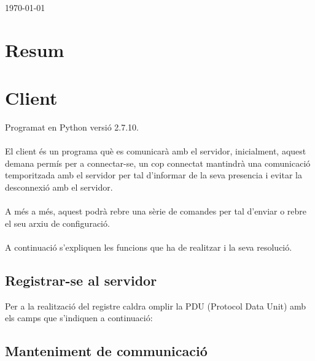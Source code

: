 \documentclass[11pt]{article}
\begin{document}
\begin{titlepage}


{\large \today}\\[3cm] %


\vfill %

\end{titlepage}
\newpage
\section*{Resum}
\justify
\newpage
\tableofcontents
\newpage
\section{Client}
\justify
Programat en Python versió 2.7.10.
\\\\
El client és un programa què es comunicarà amb el servidor, inicialment, aquest demana permís per a connectar-se, un cop connectat mantindrà una comunicació temporitzada amb el servidor per tal d'informar de la seva presencia i evitar la desconnexió amb el servidor.
\\\\
A més a més, aquest podrà rebre una sèrie de comandes per tal d'enviar o rebre el seu arxiu de configuració.
\\\\
A continuació s'expliquen les funcions que ha de realitzar i la seva resolució.

	\subsection{Registrar-se al servidor}
Per a la realització del registre caldra omplir la PDU (Protocol Data Unit) amb els camps que s'indiquen a continuació:




	\subsection{Manteniment de communicació}
\end{document}
